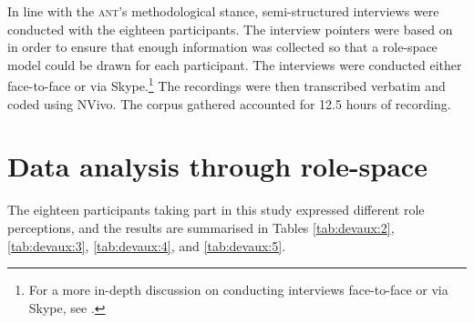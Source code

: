 \documentclass[output=paper]{langsci/langscibook}
\begin{document}
In line with the \textsc{ant}’s methodological stance, semi-structured interviews were conducted with the eighteen participants. The interview pointers were based on  in order to ensure that enough information was collected so that a role-space model could be drawn for each participant. The interviews were conducted either face-to-face or via Skype.\footnote{For a more in-depth discussion on conducting interviews face-to-face or via Skype, see \citet{Devaux2017b}.} The recordings were then transcribed verbatim and coded using NVivo. The corpus gathered accounted for 12.5 hours of recording. 

\section{Data analysis through role-space}
\label{sec:devaux:5}
The eighteen participants taking part in this study expressed different role perceptions, and the results are summarised in Tables \ref{tab:devaux:2}, \ref{tab:devaux:3}, \ref{tab:devaux:4}, and \ref{tab:devaux:5}.

\begin{table}
\caption{Role-space in \textsc{vci a}\label{tab:devaux:2}}
\end{table}
\end{document}
